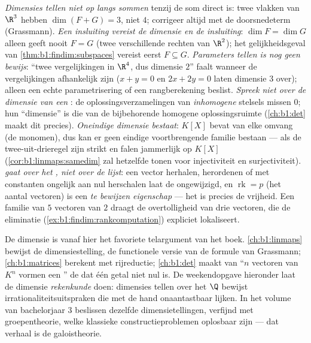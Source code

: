 \begin{remark}
\label{rem:b1:findim:pitfalls}
\emph{Dimensies tellen niet op langs sommen} tenzij de som direct
is: twee vlakken van $\R^3$ hebben $\dim(F + G) = 3$, niet $4$;
corrigeer altijd met de doorsnedeterm (Grassmann).
\emph{Een insluiting vereist de dimensie \emph{en} de
insluiting}: $\dim F = \dim G$ alleen geeft nooit $F = G$ (twee
verschillende rechten van $\R^2$); het gelijkheidsgeval van
\cref{thm:b1:findim:subspaces} vereist eerst $F \subseteq G$.
\emph{Parameters tellen is nog geen bewijs}: ``twee vergelijkingen
in $\R^4$, dus dimensie $2$'' faalt wanneer de vergelijkingen
afhankelijk zijn ($x + y = 0$ en $2x + 2y = 0$ laten dimensie $3$
over); alleen een echte parametrisering of een rangberekening
beslist.
\emph{Spreek niet over de dimensie van een }: de
oplossingsverzamelingen van \emph{inhomogene} stelsels missen $0$;
hun ``dimensie'' is die van de bijbehorende homogene
oplossingsruimte (\cref{ch:b1:det} maakt dit precies).
\emph{Oneindige dimensie bestaat}: $K[X]$ bevat  van
elke omvang (de monomen), dus kan er geen eindige voortbrengende
familie bestaan ---  als de twee-uit-drieregel zijn
strikt  en falen jammerlijk op $K[X]$
(\cref{cor:b1:linmaps:samedim} zal hetzelfde tonen voor
injectiviteit en surjectiviteit).
\emph{ gaat over het , niet over de lijst}: een
vector herhalen, herordenen of met constanten ongelijk aan nul
herschalen laat de  ongewijzigd, en $\operatorname{rk} = p$
(het aantal vectoren) is een \emph{te bewijzen eigenschap} --- het
is precies de vrijheid. Een familie van $5$ vectoren van  $2$
draagt de overtolligheid van drie vectoren, die de eliminatie
(\cref{ex:b1:findim:rankcomputation}) expliciet lokaliseert.
\end{remark}

\begin{remark}
\label{rem:b1:findim:whereused}
De dimensie is vanaf hier het favoriete telargument van het boek.
\cref{ch:b1:linmaps} bewijst de dimensiestelling, de functionele
versie van de formule van Grassmann; \cref{ch:b1:matrices} berekent
 met rijreductie; \cref{ch:b1:det} maakt van ``$n$ vectoren
van $K^n$ vormen een '' de  dat één getal niet nul
is. De weekendopgave hieronder laat de dimensie \emph{rekenkunde}
doen: dimensies tellen over het  $\Q$ bewijst
irrationaliteitsuitspraken die met de hand onaantastbaar lijken. In
het volume van bachelorjaar 3 beslissen dezelfde
dimensietellingen, verfijnd met groepentheorie, welke klassieke
constructieproblemen oplosbaar zijn --- dat verhaal is de
galoistheorie.
\end{remark}

